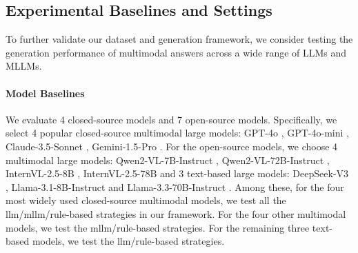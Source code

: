 \subsection{Experimental Baselines and Settings}
To further validate our dataset and generation framework, we consider testing the generation performance of multimodal answers across a wide range of LLMs and MLLMs. 

\paragraph{Model Baselines} We evaluate 4 closed-source models and 7 open-source models. Specifically, we select 4 popular closed-source multimodal large models: GPT-4o \citep{gpt4o}, GPT-4o-mini \citep{gpt4o_mini}, Claude-3.5-Sonnet \citep{anthropic_claude_2024}, Gemini-1.5-Pro \citep{team2024gemini}. For the open-source models, we choose 4 multimodal large models: Qwen2-VL-7B-Instruct \citep{wang2024qwen2}, Qwen2-VL-72B-Instruct \citep{wang2024qwen2}, InternVL-2.5-8B \citep{chen2024expanding}, InternVL-2.5-78B \citep{chen2024expanding} and 3 text-based large models: 
DeepSeek-V3 \citep{liu2024deepseek}, Llama-3.1-8B-Instruct \citep{dubey2024llama} and Llama-3.3-70B-Instruct \citep{dubey2024llama}. Among these, for the four most widely used closed-source multimodal models, we test all the llm/mllm/rule-based strategies in our framework. For the four other multimodal models, we test the mllm/rule-based strategies. For the remaining three text-based models, we test the llm/rule-based strategies.

